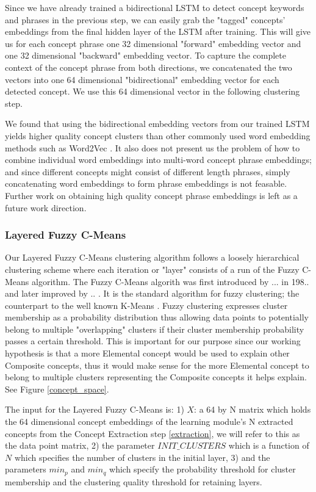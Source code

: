 Since we have already trained a bidirectional LSTM to detect concept keywords and phrases in the previous step, we can easily grab the "tagged" concepts' embeddings from the final hidden layer of the LSTM after training. This will give us for each concept phrase one 32 dimensional "forward" embedding vector and one 32 dimensional "backward" embedding vector. To capture the complete context of the concept phrase from both directions, we concatenated the two vectors into one 64 dimensional "bidirectional" embedding vector for each detected concept. We use this 64 dimensional vector in the following clustering step.

We found that using the bidirectional embedding vectors from our trained LSTM yields higher quality concept clusters than other commonly used word embedding methods such as Word2Vec \cite{}. It also does not present us the problem of how to combine individual word embeddings into multi-word concept phrase embeddings; and since different concepts might consist of different length phrases, simply concatenating word embeddings to form phrase embeddings is not feasable. Further work on obtaining high quality concept phrase embeddings is left as a future work direction.

\subsubsection{Layered Fuzzy C-Means}
Our Layered Fuzzy C-Means clustering algorithm follows a loosely hierarchical clustering scheme where each iteration or "layer" consists of a run of the Fuzzy C-Means algorithm. The Fuzzy C-Means algorith was first introduced by ... in 198.. \cite{} and later improved by .. \cite{}. It is the standard algorithm for fuzzy clustering; the counterpart to the well known K-Means \cite{}. Fuzzy clustering expresses cluster membership as a probability distribution thus allowing data points to potentially belong to multiple "overlapping" clusters if their cluster membership probability passes a certain threshold. This is important for our purpose since our working hypothesis is that a more Elemental concept would be used to explain other Composite concepts, thus it would make sense for the more Elemental concept to belong to multiple clusters representing the Composite concepts it helps explain. See Figure \ref{concept_space}.

The input for the Layered Fuzzy C-Means is: 1) $X$: a 64 by N matrix which holds the 64 dimensional concept embeddings of the learning module's N extracted concepts from the Concept Extraction step \ref{extraction}, we will refer to this as the data point matrix, 2) the parameter $INIT\_CLUSTERS$ which is a function of $N$ which specifies the number of clusters in the initial layer, 3) and the parameters $min_p$ and $min_q$ which specify the probability threshold for cluster membership and the clustering quality threshold for retaining layers.


